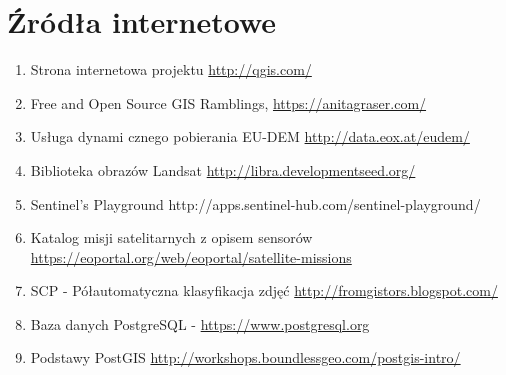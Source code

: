 \documentclass[12pt,a4paper]{book}
\begin{document}
\section{Źródła internetowe}
\begin{enumerate}
\item Strona internetowa projektu \url{http://qgis.com/}
\item Free and Open Source GIS Ramblings, \url{https://anitagraser.com/}
\item Usługa dynami cznego pobierania EU-DEM \url{http://data.eox.at/eudem/}
\item Biblioteka obrazów Landsat \url{http://libra.developmentseed.org/}
\item Sentinel’s Playground http://apps.sentinel-hub.com/sentinel-playground/
\item Katalog misji satelitarnych z opisem sensorów 
\\ \url{https://eoportal.org/web/eoportal/satellite-missions}
\item SCP - Półautomatyczna klasyfikacja zdjęć \url{http://fromgistors.blogspot.com/}
\item Baza danych PostgreSQL - \url{https://www.postgresql.org}
\item Podstawy PostGIS \url{http://workshops.boundlessgeo.com/postgis-intro/}
\end{enumerate}

\printbibliography
\renewcommand\contentsname{Spis treści}
\tableofcontents
\end{document}
